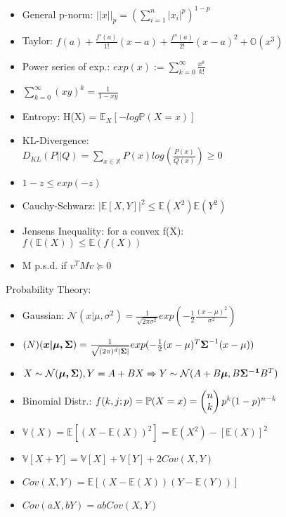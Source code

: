 \begin{itemize}
    \item General p-norm: $||x||_p = (\sum_{i=1}^{n}|x_i|^p)^{1-p}$
    \item Taylor: $f(a) + \frac{f'(a)}{1!}(x-a)  + \frac{f''(a)}{2!}(x-a)^2 + \mathbb{O}(x^3)$
    \item Power series of exp.: $exp(x) := \sum_{k=0}^{\infty}\frac{x^k}{k!}$
    \item $\sum_{k=0}^\infty (xy)^k = \frac{1}{1-xy}$
    \item Entropy: H(X) = $\mathbb{E}_X\left[-log\mathbb{P}(X=x)\right]$
    \item KL-Divergence: \\$D_{KL}(P||Q)=\sum_{x\in \mathbb{X}}P(x)log\left(\frac{P(x)}{Q(x)}\right) \geq 0$
    \item $1-z \leq exp(-z)$
    \item Cauchy-Schwarz: $|\mathbb{E}\left[X,Y\right]|^2 \leq\mathbb{E}(X^2)\mathbb{E}(Y^2)$
    \item Jensens Inequality: for a convex f(X): \\$f(\mathbb{E}(X))\leq\mathbb{E}(f(X))$
    \item M p.s.d. if $v^T M v \succeq 0$
\end{itemize}
Probability Theory:
\begin{itemize}
    \item Gaussian: $\mathcal{N}(x|\mu,\sigma^2) = \frac{1}{\sqrt{2\pi\sigma^2}}exp(-\frac{1}{2}\frac{(x-\mu)^2}{\sigma^2})$
    \item $\mathcal(N)(\boldsymbol{x|\mu,\Sigma}) = \\\frac{1}{\sqrt{(2\pi)^d|\boldsymbol{\Sigma}|}}exp(-\frac{1}{2}(x - \mu)^T\boldsymbol{\Sigma}^{-1}(x-\mu))$
    \item $X\sim\mathcal{N}(\boldsymbol{\mu,\Sigma}), Y=A + BX \Rightarrow \\Y \sim \mathcal{N}(A + B\boldsymbol{\mu},B\boldsymbol{\Sigma^{-1}}B^T)$
    \item Binomial Distr.: $f(k,j;p) = \\\mathbb{P}(X=x)=\begin{pmatrix}
        n\\k
    \end{pmatrix}p^k(1-p)^{n-k}$
    \item $\mathbb{V}(X) = \mathbb{E}\left[(X-\mathbb{E}(X))^2\right]=\mathbb{E}(X^2) - \left[\mathbb{E}(X)\right]^2$
    \item $\mathbb{V}\left[X + Y\right] = \mathbb{V}\left[X\right] + \mathbb{V}\left[Y\right] + 2 Cov(X,Y)$
    \item $Cov(X,Y) = \mathbb{E}\left[(X-\mathbb{E}(X))(Y-\mathbb{E}(Y))\right]$
    \item $Cov(aX,bY) = abCov(X,Y)$
\end{itemize}
